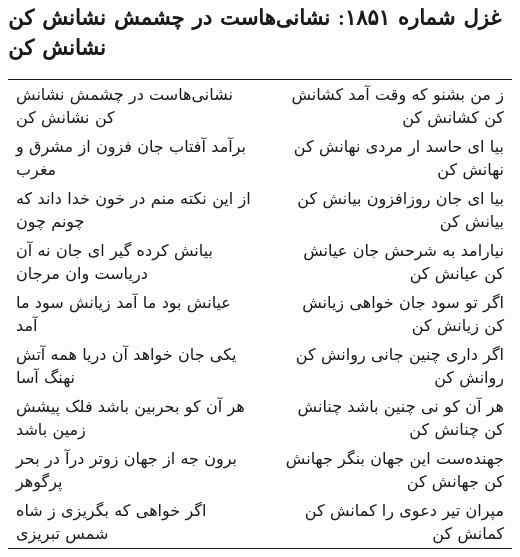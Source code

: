 \begin{center}
\section*{غزل شماره ۱۸۵۱: نشانی‌هاست در چشمش نشانش کن نشانش کن}
\label{sec:1851}
\begin{longtable}{l p{0.5cm} r}
نشانی‌هاست در چشمش نشانش کن نشانش کن
&&
ز من بشنو که وقت آمد کشانش کن کشانش کن
\\
برآمد آفتاب جان فزون از مشرق و مغرب
&&
بیا ای حاسد ار مردی نهانش کن نهانش کن
\\
از این نکته منم در خون خدا داند که چونم چون
&&
بیا ای جان روزافزون بیانش کن بیانش کن
\\
بیانش کرده گیر ای جان نه آن دریاست وان مرجان
&&
نیارامد به شرحش جان عیانش کن عیانش کن
\\
عیانش بود ما آمد زیانش سود ما آمد
&&
اگر تو سود جان خواهی زیانش کن زیانش کن
\\
یکی جان خواهد آن دریا همه آتش نهنگ آسا
&&
اگر داری چنین جانی روانش کن روانش کن
\\
هر آن کو بحربین باشد فلک پیشش زمین باشد
&&
هر آن کو نی چنین باشد چنانش کن چنانش کن
\\
برون جه از جهان زوتر درآ در بحر پرگوهر
&&
جهنده‌ست این جهان بنگر جهانش کن جهانش کن
\\
اگر خواهی که بگریزی ز شاه شمس تبریزی
&&
مپران تیر دعوی را کمانش کن کمانش کن
\\
\end{longtable}
\end{center}
